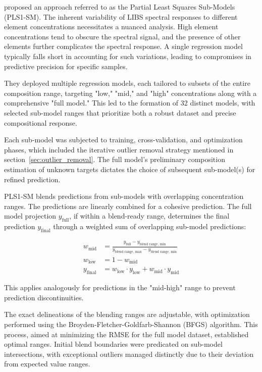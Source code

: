 \citet{andersonImprovedAccuracyQuantitative2017} proposed an approach referred to as the Partial Least Squares Sub-Models (PLS1-SM).
The inherent variability of LIBS spectral responses to different element concentrations necessitates a nuanced analysis. High element concentrations tend to obscure the spectral signal, and the presence of other elements further complicates the spectral response. A single regression model typically falls short in accounting for such variations, leading to compromises in predictive precision for specific samples.

They deployed multiple regression models, each tailored to subsets of the entire composition range, targeting "low," "mid," and "high" concentrations along with a comprehensive "full model." This led to the formation of 32 distinct models, with selected sub-model ranges that prioritize both a robust dataset and precise compositional response.

Each sub-model was subjected to training, cross-validation, and optimization phases, which included the iterative outlier removal strategy mentioned in section~\ref{sec:outlier_removal}. The full model's preliminary composition estimation of unknown targets dictates the choice of subsequent sub-model(s) for refined prediction.

PLS1-SM blends predictions from sub-models with overlapping concentration ranges. The predictions are linearly combined for a cohesive prediction. The full model projection $y_{\text{full}}$, if within a blend-ready range, determines the final prediction $y_{\text{final}}$ through a weighted sum of overlapping sub-model predictions:

\begin{align*}
w_{\text{mid}} &= \frac{y_{\text{full}}-y_{\text{blend range, min}}}{y_{\text{blend range, max}} - y_{\text{blend range, min}}} \\
w_{\text{low}} &= 1 - w_{\text{mid}} \\
y_{\text{final}} &= w_{\text{low}}\cdot y_{\text{low}} + w_{\text{mid}}\cdot y_{\text{mid}}
\end{align*}

This applies analogously for predictions in the "mid-high" range to prevent prediction discontinuities.

The exact delineations of the blending ranges are adjustable, with optimization performed using the Broyden-Fletcher-Goldfarb-Shannon (BFGS) algorithm. This process, aimed at minimizing the RMSE for the full model dataset, established optimal ranges. Initial blend boundaries were predicated on sub-model intersections, with exceptional outliers managed distinctly due to their deviation from expected value ranges.

